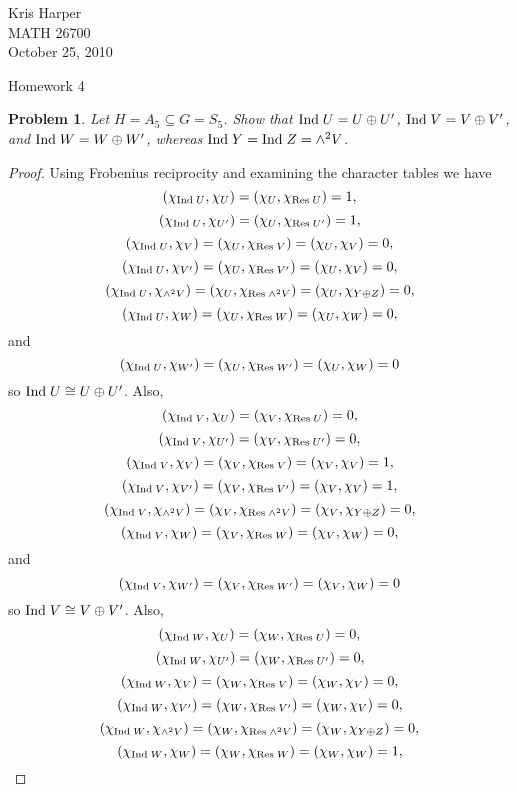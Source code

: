 \documentclass{article}
\newcommand{\ind}{\textup{Ind}\;}
\newcommand{\res}{\textup{Res}\;}
\newtheorem{problem}{Problem}
\begin{document}
\begin{flushright}
Kris Harper\\

MATH 26700\\

October 25, 2010
\end{flushright}

\begin{center}
Homework 4
\end{center}

\begin{problem}
Let $H = A_5 \subseteq G = S_5$. Show that $\ind U = U \oplus U'$, $\ind V = V \oplus V'$, and $\ind W = W \oplus W'$, whereas $\ind Y = \ind Z = \wedge^2 V$.
\end{problem}
\begin{proof}
Using Frobenius reciprocity and examining the character tables we have
\[
(\chi_{\ind U}, \chi_U) = (\chi_U, \chi_{\res U}) = 1,
\]
\[
(\chi_{\ind U}, \chi_{U'}) = (\chi_U, \chi_{\res U'}) = 1,
\]
\[
(\chi_{\ind U}, \chi_V) = (\chi_U, \chi_{\res V}) = (\chi_U, \chi_V) = 0,
\]
\[
(\chi_{\ind U}, \chi_{V'}) = (\chi_U, \chi_{\res V'}) = (\chi_U, \chi_V) = 0,
\]
\[
(\chi_{\ind U}, \chi_{\wedge^2 V}) = (\chi_U, \chi_{\res \wedge^2 V}) = (\chi_U, \chi_{Y \oplus Z}) = 0,
\]
\[
(\chi_{\ind U}, \chi_W) = (\chi_U, \chi_{\res W}) = (\chi_U, \chi_W) = 0,
\]
and
\[
(\chi_{\ind U}, \chi_{W'}) = (\chi_U, \chi_{\res W'}) = (\chi_U, \chi_W) = 0
\]
so $\ind U \cong U \oplus U'$. Also,
\[
(\chi_{\ind V}, \chi_U) = (\chi_V, \chi_{\res U}) = 0,
\]
\[
(\chi_{\ind V}, \chi_{U'}) = (\chi_V, \chi_{\res U'}) = 0,
\]
\[
(\chi_{\ind V}, \chi_V) = (\chi_V, \chi_{\res V}) = (\chi_V, \chi_V) = 1,
\]
\[
(\chi_{\ind V}, \chi_{V'}) = (\chi_V, \chi_{\res V'}) = (\chi_V, \chi_V) = 1,
\]
\[
(\chi_{\ind V}, \chi_{\wedge^2 V}) = (\chi_V, \chi_{\res \wedge^2 V}) = (\chi_V, \chi_{Y \oplus Z}) = 0,
\]
\[
(\chi_{\ind V}, \chi_W) = (\chi_V, \chi_{\res W}) = (\chi_V, \chi_W) = 0,
\]
and
\[
(\chi_{\ind V}, \chi_{W'}) = (\chi_V, \chi_{\res W'}) = (\chi_V, \chi_W) = 0
\]
so $\ind V \cong V \oplus V'$. Also,
\[
(\chi_{\ind W}, \chi_U) = (\chi_W, \chi_{\res U}) = 0,
\]
\[
(\chi_{\ind W}, \chi_{U'}) = (\chi_W, \chi_{\res U'}) = 0,
\]
\[
(\chi_{\ind W}, \chi_V) = (\chi_W, \chi_{\res V}) = (\chi_W, \chi_V) = 0,
\]
\[
(\chi_{\ind W}, \chi_{V'}) = (\chi_W, \chi_{\res V'}) = (\chi_W, \chi_V) = 0,
\]
\[
(\chi_{\ind W}, \chi_{\wedge^2 V}) = (\chi_W, \chi_{\res \wedge^2 V}) = (\chi_W, \chi_{Y \oplus Z}) = 0,
\]
\[
(\chi_{\ind W}, \chi_W) = (\chi_W, \chi_{\res W}) = (\chi_W, \chi_W) = 1,
\]
\end{proof}
\end{document}
